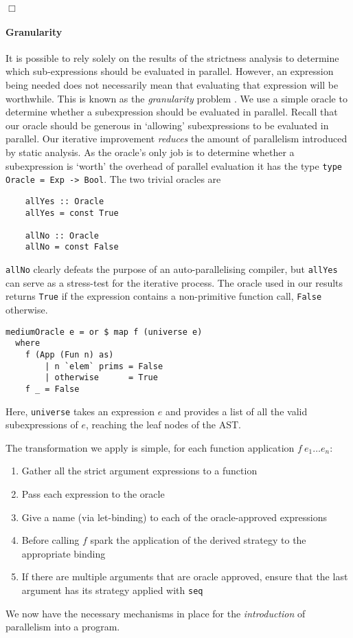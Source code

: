 \hfill$\Box$

\paragraph{Granularity}

It is possible to rely solely on the results of the strictness analysis to
determine which sub-expressions should be evaluated in parallel. However, an
expression being needed does not necessarily mean that evaluating that
expression will be worthwhile. This is known as the \emph{granularity} problem
\citep{hammond2000research}. We use a simple oracle to determine whether a
subexpression should be evaluated in parallel. Recall that our oracle should be
generous in `allowing' subexpressions to be evaluated in parallel. Our
iterative improvement \emph{reduces} the amount of parallelism introduced by
static analysis. As the oracle's only job is to determine whether a
subexpression is `worth' the overhead of parallel evaluation it has the type
\verb+type Oracle = Exp -> Bool+. The two trivial oracles are

\begin{verbatim}
    allYes :: Oracle
    allYes = const True

    allNo :: Oracle
    allNo = const False
\end{verbatim}

\verb-allNo- clearly defeats the purpose of an auto-parallelising compiler, but
\verb-allYes- can serve as a stress-test for the iterative process. The oracle
used in our results returns \verb-True- if the expression contains a non-primitive
function call, \verb-False- otherwise.

\begin{verbatim}
mediumOracle e = or $ map f (universe e)
  where
    f (App (Fun n) as)
        | n `elem` prims = False
        | otherwise      = True
    f _ = False
\end{verbatim}

Here, \verb-universe- takes an expression $e$ and provides a list of all the
valid subexpressions of $e$, reaching the leaf nodes of the AST.

The transformation we apply is simple, for each function application $f \ e_{1}
\dots e_{n}$:

\begin{enumerate}
    \item Gather all the strict argument expressions to a function
    \item Pass each expression to the oracle
    \item Give a name (via let-binding) to each of the oracle-approved expressions
    \item Before calling $f$ spark the application of the derived
        strategy to the appropriate binding
    \item If there are multiple arguments that are oracle approved, ensure that
        the last argument has its strategy applied with \verb-seq-
\end{enumerate}

We now have the necessary mechanisms in place for the \emph{introduction} of
parallelism into a program.

